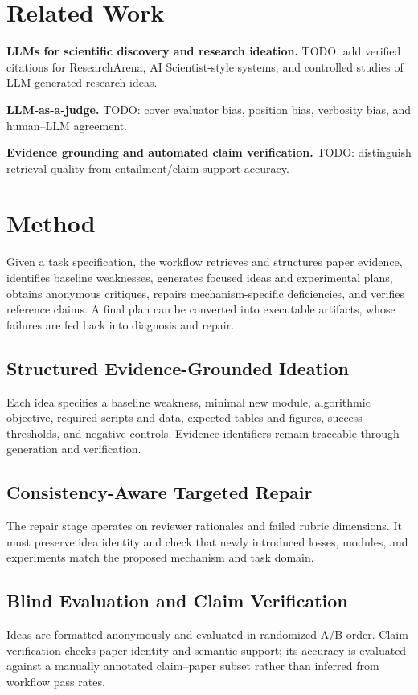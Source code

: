 \documentclass[letterpaper]{article}
\begin{document}
\section{Related Work}
\textbf{LLMs for scientific discovery and research ideation.} TODO: add verified citations for ResearchArena, AI Scientist-style systems, and controlled studies of LLM-generated research ideas.

\textbf{LLM-as-a-judge.} TODO: cover evaluator bias, position bias, verbosity bias, and human--LLM agreement.

\textbf{Evidence grounding and automated claim verification.} TODO: distinguish retrieval quality from entailment/claim support accuracy.

\section{Method}
Given a task specification, the workflow retrieves and structures paper evidence, identifies baseline weaknesses, generates focused ideas and experimental plans, obtains anonymous critiques, repairs mechanism-specific deficiencies, and verifies reference claims. A final plan can be converted into executable artifacts, whose failures are fed back into diagnosis and repair.

\subsection{Structured Evidence-Grounded Ideation}
Each idea specifies a baseline weakness, minimal new module, algorithmic objective, required scripts and data, expected tables and figures, success thresholds, and negative controls. Evidence identifiers remain traceable through generation and verification.

\subsection{Consistency-Aware Targeted Repair}
The repair stage operates on reviewer rationales and failed rubric dimensions. It must preserve idea identity and check that newly introduced losses, modules, and experiments match the proposed mechanism and task domain.

\subsection{Blind Evaluation and Claim Verification}
Ideas are formatted anonymously and evaluated in randomized A/B order. Claim verification checks paper identity and semantic support; its accuracy is evaluated against a manually annotated claim--paper subset rather than inferred from workflow pass rates.
\end{document}
